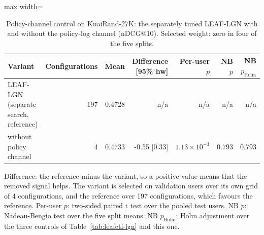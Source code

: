 \begin{table}[tbp]
\centering
\footnotesize
\caption{Policy-channel control on KuaiRand-27K: the separately tuned LEAF-LGN with and without the policy-log channel (nDCG@10). Selected weight: zero in four of the five splits.}
\label{tab:policy}
\begin{adjustbox}{max width=\linewidth}
\begin{tabular}{lrrrrrr}
\toprule
Variant & Configurations & Mean & Difference [95\% hw] & Per-user $p$ & NB $p$ & NB $p_{\mathrm{Holm}}$ \\
\midrule
LEAF-LGN (separate search, reference) & 197 & 0.4728 & n/a & n/a & n/a & n/a \\
\midrule
without policy channel & 4 & 0.4733 & -0.55 [0.33] & $1.13\times10^{-3}$ & 0.793 & 0.793 \\
\bottomrule
\end{tabular}
\end{adjustbox}
\par\smallskip
\begin{minipage}{\linewidth}\raggedright\footnotesize Difference: the reference minus the variant, so a positive value means that the removed signal helps. The variant is selected on validation users over its own grid of 4 configurations, and the reference over 197 configurations, which favours the reference. Per-user $p$: two-sided paired t test over the pooled test users. NB $p$: Nadeau-Bengio test over the five split means. NB $p_{\mathrm{Holm}}$: Holm adjustment over the three controls of Table~\ref{tab:leafctl-lgn} and this one.\end{minipage}
\end{table}
